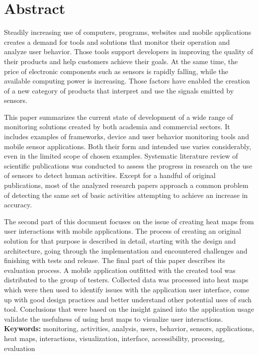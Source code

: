 \chapter*{Abstract}
Steadily increasing use of computers, programs, websites and mobile applications creates a demand for tools and solutions that monitor their operation and analyze user behavior. Those tools support developers in improving the quality of their products and help customers achieve their goals. At the same time, the price of electronic components such as sensors is rapidly falling, while the available computing power is increasing. Those factors have enabled the creation of a new category of products that interpret and use the signals emitted by sensors.

This paper summarizes the current state of development of a wide range of monitoring solutions created by both academia and commercial sectors. It includes examples of frameworks, device and user behavior monitoring tools and mobile sensor applications. Both their form and intended use varies considerably, even in the limited scope of chosen examples. Systematic literature review of scientific publications was conducted to assess the progress in research on the use of sensors to detect human activities. Except for a handful of original publications, most of the analyzed research papers approach a common problem of detecting the same set of basic activities attempting to achieve an increase in accuracy.

The second part of this document focuses on the issue of creating heat maps from user interactions with mobile applications. The process of creating an original solution for that purpose is described in detail, starting with the design and architecture, going through the implementation and encountered challenges and finishing with tests and release. The final part of this paper describes its evaluation process. A mobile application outfitted with the created tool was distributed to the group of testers. Collected data was processed into heat maps which were then used to identify issues with the application user interface, come up with good design practices and better understand other potential uses of such tool. Conclusions that were based on the insight gained into the application usage validate the usefulness of using heat maps to visualize user interactions. \\

\noindent\textbf{Keywords:} monitoring, activities, analysis, users, behavior, sensors, applications, heat maps, interactions, visualization, interface, accessibility, processing, evaluation
